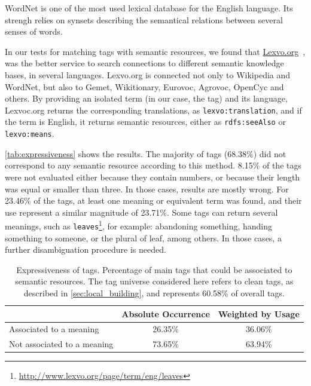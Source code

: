 WordNet \cite{Fellbaum1998} is one of the most used lexical database for the English language.
Its strengh relies on synsets describing the semantical relations between several senses of words.

In our tests for matching tags with semantic resources, we found that \url{Lexvo.org}~\cite{Melo2013}, was the better service to search connections to different semantic knowledge bases, in several languages.
Lexvo.org is connected not only to Wikipedia and WordNet, but also to Gemet, Wikitionary, Eurovoc, Agrovoc, OpenCyc and others.
By providing an isolated term (in our case, the tag) and its language, Lexvoc.org returns the corresponding translations, as \texttt{lexvo:translation}, and if the term is English, it returns semantic resources, either as \texttt{rdfs:seeAlso} or \texttt{lexvo:means}.

\autoref{tab:expressiveness} shows the results. 
The majority of tags (68.38\%) did not correspond to any semantic resource according to this method.
8.15\% of the tags were not evaluated either because they contain numbers, or because their length was equal or smaller than three. 
In those cases, results are mostly wrong.
For 23.46\% of the tags, at least one meaning or equivalent term was found, and their use represent a similar magnitude of 23.71\%.
Some tags can return several meanings, such as \texttt{leaves}\footnote{\url{http://www.lexvo.org/page/term/eng/leaves}}, for example: abandoning something, handing something to someone, or the plural of leaf, among others. 
In those cases, a further disambiguation procedure is needed.

\begin{table}[]
\centering
\caption[Expressiveness of tags.]{Expressiveness of tags. Percentage of main tags that could be associated to semantic resources. The tag universe considered here refers to clean tags, as described in \autoref{sec:local_building}, and represents 60.58\% of overall tags.}
\label{tab:expressiveness}
\begin{tabular}{|l|c|c|}
\hline
                            & \textbf{Absolute Occurrence} & \textbf{Weighted by Usage} \\ \hline
Associated to a meaning     & 26.35\%           & 36.06\%                    \\ \hline
Not associated to a meaning & 73.65\%           & 63.94\%                    \\ \hline
\end{tabular}
\end{table}

